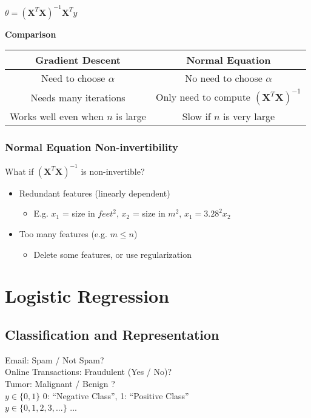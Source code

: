 \documentclass{article}
\newcommand{\vect}[1]{\boldsymbol{#1}}
\begin{document}
$\theta = (\vect{X}^T\vect{X})^{-1}\vect{X}^Ty$ \\


\begin{center}
\textbf{Comparison} \\
\begin{tabular}{ |c | c | }
\hline
Gradient Descent & Normal Equation \\ 
\hline
Need to choose $\alpha$ & No need to choose $\alpha$ \\  
\hline
Needs many iterations & Only need to compute $(\vect{X}^T\vect{X})^{-1}$ \\
\hline
Works well even when $n$ is large & Slow if $n$ is very large \\
\hline
\end{tabular}
\end{center}

\subsubsection{Normal Equation Non-invertibility}
What if $(\vect{X}^T\vect{X})^{-1}$ is non-invertible?
\begin{itemize}
  \item Redundant features (linearly dependent)
  \begin{itemize}
    \item E.g. $x_1$ = size in $feet^2$, $x_2$ = size in $m^2$, $x_1 = 3.28^2 x_2$
  \end{itemize}
  \item Too many features (e.g. $m \le n$)
  \begin{itemize}
    \item Delete some features, or use regularization
  \end{itemize}
\end{itemize}

\section{Logistic Regression}
\subsection{Classification and Representation}
Email: Spam / Not Spam? \\
Online Transactions: Fraudulent (Yes / No)? \\
Tumor: Malignant / Benign ? \\

$y \in \{0, 1\}$ 0: ``Negative Class'', 1: ``Positive Class''\\
$y \in \{0, 1, 2, 3, ...\}$ ...\\
\end{document}
